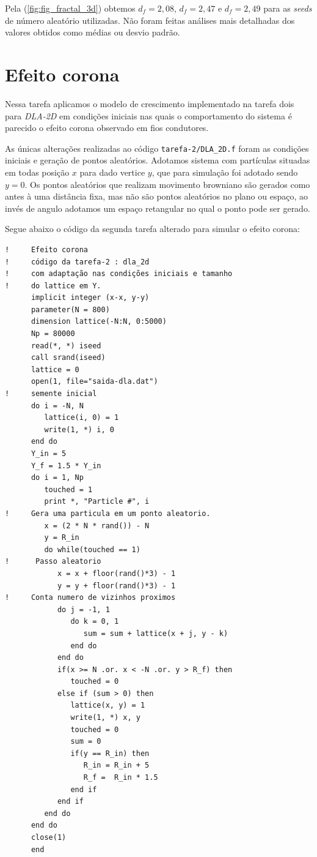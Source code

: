 \documentclass[a4paper, 11pt]{tufte-handout}
\begin{document}
Pela (\ref{fig:fig_fractal_3d}) obtemos \( d_f =  2,08 \), \( d_f = 2,47 \) e \( d_f = 2,49 \)
para as \emph{seeds} de número aleatório utilizadas.
Não foram feitas análises mais detalhadas dos valores obtidos como médias ou desvio padrão.


\clearpage
\section{Efeito corona}

Nessa tarefa aplicamos o modelo de crescimento implementado na tarefa dois para \emph{DLA-2D}
em condições iniciais nas quais o comportamento do sistema é parecido o efeito corona observado
em fios condutores.

As únicas alterações realizadas ao código \verb|tarefa-2/DLA_2D.f| foram as condições iniciais
e geração de pontos aleatórios. Adotamos sistema com partículas situadas em todas posição \( x \)
para dado vertice \( y \), que para simulação foi adotado sendo \( y = 0\). Os pontos aleatórios que
realizam movimento browniano são gerados como antes à uma distância fixa, mas não são pontos
aleatórios no plano ou espaço, ao invés de angulo adotamos um espaço retangular no qual o ponto pode
ser gerado.


Segue abaixo o código da segunda tarefa alterado para simular o efeito corona:


\begin{verbatim}
!     Efeito corona
!     código da tarefa-2 : dla_2d
!     com adaptação nas condições iniciais e tamanho
!     do lattice em Y.
      implicit integer (x-x, y-y)
      parameter(N = 800)
      dimension lattice(-N:N, 0:5000)
      Np = 80000
      read(*, *) iseed
      call srand(iseed)
      lattice = 0
      open(1, file="saida-dla.dat")
!     semente inicial
      do i = -N, N
         lattice(i, 0) = 1
         write(1, *) i, 0
      end do
      Y_in = 5
      Y_f = 1.5 * Y_in
      do i = 1, Np
         touched = 1
         print *, "Particle #", i
!     Gera uma particula em um ponto aleatorio.
         x = (2 * N * rand()) - N
         y = R_in
         do while(touched == 1) 
!      Passo aleatorio
            x = x + floor(rand()*3) - 1
            y = y + floor(rand()*3) - 1
!     Conta numero de vizinhos proximos
            do j = -1, 1
               do k = 0, 1
                  sum = sum + lattice(x + j, y - k)
               end do
            end do
            if(x >= N .or. x < -N .or. y > R_f) then
               touched = 0
            else if (sum > 0) then
               lattice(x, y) = 1
               write(1, *) x, y
               touched = 0
               sum = 0
               if(y == R_in) then
                  R_in = R_in + 5  
                  R_f =  R_in * 1.5
               end if 
            end if
         end do
      end do
      close(1)
      end
\end{verbatim}
\end{document}
